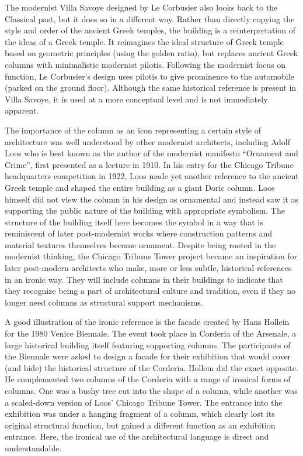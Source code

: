 The modernist Villa Savoye designed by Le Corbusier also looks back to the Classical past,
but it does so in a different way. Rather than directly copying the style and order of the
ancient Greek temples, the building is a reinterpretation of the ideas of a Greek
temple.
It reimagines the ideal structure of Greek temple based on geometric principles (using the golden
ratio), but replaces ancient Greek columns with minimalistic modernist pilotis. Following the
modernist focus on function, Le Corbusier's design uses pilotis to give prominence to the
automobile (parked on the ground floor). Although the same historical reference is present in Villa
Savoye, it is used at a more conceptual level and is not immediately apparent.

The importance of the column as an icon representing a certain style of architecture was well
understood by other modernist architects, including Adolf Loos who is best known as the author
of the modernist manifesto ``Ornament and Crime'', first presented as a lecture in 1910. In his entry
for the Chicago Tribune headquarters competition in 1922, Loos made yet another reference to the
ancient Greek temple and shaped the entire building as a giant Doric column.  Loos himself did not
view the column in his design as ornamental and instead saw it as supporting the public nature of
the building with appropriate symbolism.
The structure of the building itself here becomes the symbol in a way that is reminiscent
of later post-modernist works where construction patterns and material textures themselves become
ornament. Despite being rooted in the modernist thinking, the Chicago Tribune
Tower project became an inspiration for later post-modern architects who make, more or less subtle,
historical references in an ironic way. They will include columns in their buildings to indicate
that they recognize being a part of architectural culture and tradition, even if they no longer
need columns as structural support mechanisms.

A good illustration of the ironic reference is the facade created by Hans Hollein for the 1980
Venice Biennale. The event took place in Corderia of the Arsenale, a large historical building
itself featuring supporting columns. The participants of the Biennale were asked to design a
facade for their exhibition that would cover (and hide) the historical structure of the Corderia.
Hollein did the exact opposite. He complemented two columns of the Corderia with a range of
ironical forms of columns. One was a bushy tree cut into the shape of a column, while another was
a scaled-down version of Loos' Chicago Tribune Tower. The entrance into the exhibition was under
a hanging fragment of a column, which clearly lost its original structural function, but gained
a different function as an exhibition entrance. Here, the ironical use of the architectural
language is direct and understandable.

